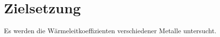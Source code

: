 
\section{Zielsetzung}
\label{sec:Zielsetzung}
Es werden die Wärmeleitkoeffizienten verschiedener Metalle untersucht.
